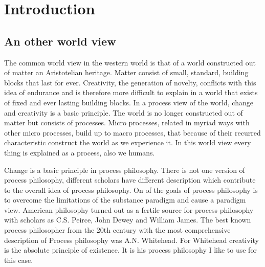 \documentclass[a4paper]{Thesis}
\begin{document}
	

\chapter{Introduction}
\section{An other world view}
The common world view in the western world is that of a world constructed out of matter an Aristotelian heritage. Matter consist of small, standard, building blocks that last for ever. 
Creativity, the generation of novelty, conflicts with this idea of endurance and is therefore more difficult to explain in a world that exists of fixed and ever lasting building blocks.
In a process view of the world, change and creativity is a basic principle. The world is no longer constructed out of matter but consists of processes. Micro processes, related in myriad ways with other micro processes, build up to macro processes, that because of their recurred characteristic construct the world as we experience it. In this world view every thing is explained as a process, also we humans. 

Change is a basic principle in process philosophy. There is not one version of process philosophy, different scholars have different description which contribute to the overall idea of process philosophy.
On of the goals of process philosophy is to overcome the limitations of the substance paradigm and cause a paradigm view.
American philosophy turned out as a fertile source for process philosophy with scholars as C.S. Peirce, John Dewey and William James. The best known process philosopher from the 20th century with the most comprehensive description of Process philosophy was A.N. Whitehead. For Whitehead creativity is the absolute principle of existence. It is his process philosophy I like to use for this case.

\end{document}
